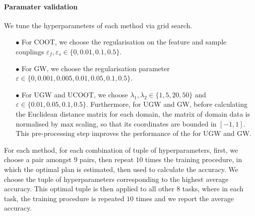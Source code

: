 \paragraph{Paramater validation}

We tune the hyperparameters of each method via grid search.
\begin{itemize}
  \item[$\bullet$] For COOT, we choose the regularisation on the feature and sample couplings
  $\varepsilon_f, \varepsilon_s \in \{0, 0.01, 0.1, 0.5\}$.
  \item[$\bullet$] For GW, we choose the regularisation parameter
  $\varepsilon \in \{0, 0.001, 0.005, 0.01, 0.05, 0.1, 0.5\}$.
  \item[$\bullet$] For UGW and UCOOT, we choose $\lambda_1, \lambda_2 \in \{1, 5, 20, 50\}$ and
  $\varepsilon \in \{0.01, 0.05, 0.1, 0.5\}$.
  Furthermore, for UGW and GW, before calculating the Euclidean distance matrix for each domain,
  the matrix of domain data is normalised by max scaling, so that its coordinates are bounded in
  $[-1,1]$. This pre-processing step improves the performance of the for UGW and GW.
\end{itemize}
For each method, for each combination of tuple of hyperparameters, first, we choose a pair
amongst $9$ pairs, then repeat $10$ times the training procedure, in which the optimal plan
is estimated, then used to calculate the accuracy. We choose the tuple of hyperparameters
corresponding to the highest average accuracy. This optimal tuple is then applied to
all other $8$ tasks, where in each task, the training procedure is repeated $10$ times and
we report the average accuracy.

